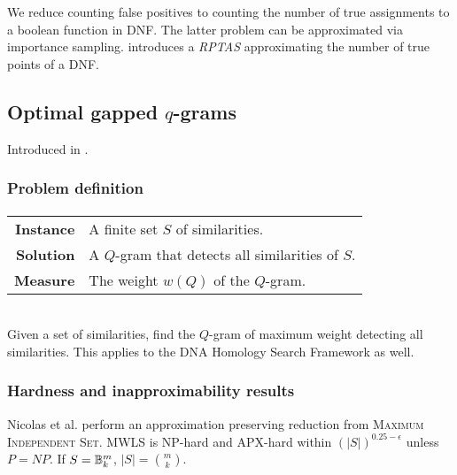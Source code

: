 We reduce counting false positives to counting the number of true assignments to a boolean function in DNF.
The latter problem can be approximated via importance sampling.
\citeauthor{Vazirani01} introduces a \emph{RPTAS} approximating the number of true points of a DNF.


\subsection{Optimal gapped $q$-grams}

Introduced in \citep{Nicolas2005}.

\subsubsection{Problem definition}

\paragraph{}
\begin{tabular}{rl}
{\bf Instance}	&	A finite set $S$ of similarities.\\
{\bf Solution}	&	A $Q$-gram that detects all similarities of $S$.\\
{\bf Measure}	&	The weight $w(Q)$ of the $Q$-gram.\\
\end{tabular}
\\

Given a set of similarities, find the $Q$-gram of maximum weight detecting all similarities.
This applies to the DNA Homology Search Framework as well.

\subsubsection{Hardness and inapproximability results}

Nicolas et al. \citep{Nicolas2005} perform an approximation preserving reduction from \textsc{Maximum Independent Set}.
MWLS is NP-hard and APX-hard within $(|S|)^{0.25 - \epsilon}$ unless $P = NP$.
If $S = \mathbb {B}^{m}_{k}$, $|S| = \binom{m}{k}$.

